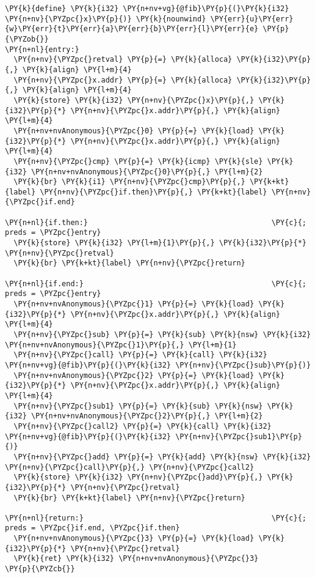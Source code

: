 \begin{Verbatim}[commandchars=\\\{\}]
\PY{k}{define} \PY{k}{i32} \PY{n+nv+vg}{@fib}\PY{p}{(}\PY{k}{i32} \PY{n+nv}{\PYZpc{}x}\PY{p}{)} \PY{k}{nounwind} \PY{err}{u}\PY{err}{w}\PY{err}{t}\PY{err}{a}\PY{err}{b}\PY{err}{l}\PY{err}{e} \PY{p}{\PYZob{}}
\PY{n+nl}{entry:}
  \PY{n+nv}{\PYZpc{}retval} \PY{p}{=} \PY{k}{alloca} \PY{k}{i32}\PY{p}{,} \PY{k}{align} \PY{l+m}{4}
  \PY{n+nv}{\PYZpc{}x.addr} \PY{p}{=} \PY{k}{alloca} \PY{k}{i32}\PY{p}{,} \PY{k}{align} \PY{l+m}{4}
  \PY{k}{store} \PY{k}{i32} \PY{n+nv}{\PYZpc{}x}\PY{p}{,} \PY{k}{i32}\PY{p}{*} \PY{n+nv}{\PYZpc{}x.addr}\PY{p}{,} \PY{k}{align} \PY{l+m}{4}
  \PY{n+nv+nvAnonymous}{\PYZpc{}0} \PY{p}{=} \PY{k}{load} \PY{k}{i32}\PY{p}{*} \PY{n+nv}{\PYZpc{}x.addr}\PY{p}{,} \PY{k}{align} \PY{l+m}{4}
  \PY{n+nv}{\PYZpc{}cmp} \PY{p}{=} \PY{k}{icmp} \PY{k}{sle} \PY{k}{i32} \PY{n+nv+nvAnonymous}{\PYZpc{}0}\PY{p}{,} \PY{l+m}{2}
  \PY{k}{br} \PY{k}{i1} \PY{n+nv}{\PYZpc{}cmp}\PY{p}{,} \PY{k+kt}{label} \PY{n+nv}{\PYZpc{}if.then}\PY{p}{,} \PY{k+kt}{label} \PY{n+nv}{\PYZpc{}if.end}

\PY{n+nl}{if.then:}                                          \PY{c}{; preds = \PYZpc{}entry}
  \PY{k}{store} \PY{k}{i32} \PY{l+m}{1}\PY{p}{,} \PY{k}{i32}\PY{p}{*} \PY{n+nv}{\PYZpc{}retval}
  \PY{k}{br} \PY{k+kt}{label} \PY{n+nv}{\PYZpc{}return}

\PY{n+nl}{if.end:}                                           \PY{c}{; preds = \PYZpc{}entry}
  \PY{n+nv+nvAnonymous}{\PYZpc{}1} \PY{p}{=} \PY{k}{load} \PY{k}{i32}\PY{p}{*} \PY{n+nv}{\PYZpc{}x.addr}\PY{p}{,} \PY{k}{align} \PY{l+m}{4}
  \PY{n+nv}{\PYZpc{}sub} \PY{p}{=} \PY{k}{sub} \PY{k}{nsw} \PY{k}{i32} \PY{n+nv+nvAnonymous}{\PYZpc{}1}\PY{p}{,} \PY{l+m}{1}
  \PY{n+nv}{\PYZpc{}call} \PY{p}{=} \PY{k}{call} \PY{k}{i32} \PY{n+nv+vg}{@fib}\PY{p}{(}\PY{k}{i32} \PY{n+nv}{\PYZpc{}sub}\PY{p}{)}
  \PY{n+nv+nvAnonymous}{\PYZpc{}2} \PY{p}{=} \PY{k}{load} \PY{k}{i32}\PY{p}{*} \PY{n+nv}{\PYZpc{}x.addr}\PY{p}{,} \PY{k}{align} \PY{l+m}{4}
  \PY{n+nv}{\PYZpc{}sub1} \PY{p}{=} \PY{k}{sub} \PY{k}{nsw} \PY{k}{i32} \PY{n+nv+nvAnonymous}{\PYZpc{}2}\PY{p}{,} \PY{l+m}{2}
  \PY{n+nv}{\PYZpc{}call2} \PY{p}{=} \PY{k}{call} \PY{k}{i32} \PY{n+nv+vg}{@fib}\PY{p}{(}\PY{k}{i32} \PY{n+nv}{\PYZpc{}sub1}\PY{p}{)}
  \PY{n+nv}{\PYZpc{}add} \PY{p}{=} \PY{k}{add} \PY{k}{nsw} \PY{k}{i32} \PY{n+nv}{\PYZpc{}call}\PY{p}{,} \PY{n+nv}{\PYZpc{}call2}
  \PY{k}{store} \PY{k}{i32} \PY{n+nv}{\PYZpc{}add}\PY{p}{,} \PY{k}{i32}\PY{p}{*} \PY{n+nv}{\PYZpc{}retval}
  \PY{k}{br} \PY{k+kt}{label} \PY{n+nv}{\PYZpc{}return}

\PY{n+nl}{return:}                                           \PY{c}{; preds = \PYZpc{}if.end, \PYZpc{}if.then}
  \PY{n+nv+nvAnonymous}{\PYZpc{}3} \PY{p}{=} \PY{k}{load} \PY{k}{i32}\PY{p}{*} \PY{n+nv}{\PYZpc{}retval}
  \PY{k}{ret} \PY{k}{i32} \PY{n+nv+nvAnonymous}{\PYZpc{}3}
\PY{p}{\PYZcb{}}
\end{Verbatim}
